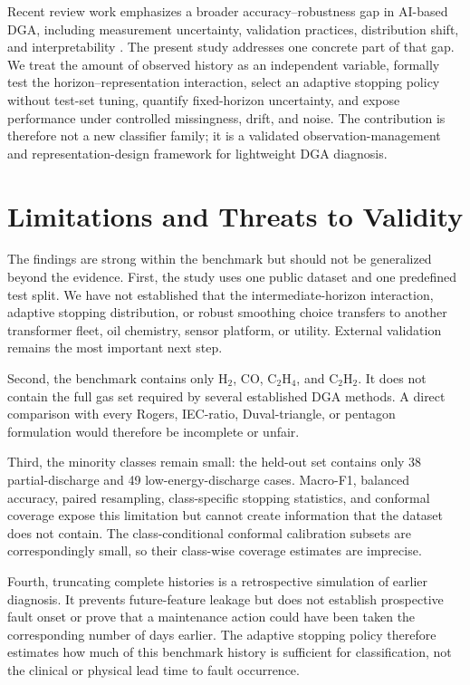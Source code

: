 \documentclass[conference]{IEEEtran}
\begin{document}
Recent review work emphasizes a broader accuracy--robustness gap in AI-based DGA, including measurement uncertainty, validation practices, distribution shift, and interpretability \cite{bouzar2026robustness}. The present study addresses one concrete part of that gap. We treat the amount of observed history as an independent variable, formally test the horizon--representation interaction, select an adaptive stopping policy without test-set tuning, quantify fixed-horizon uncertainty, and expose performance under controlled missingness, drift, and noise. The contribution is therefore not a new classifier family; it is a validated observation-management and representation-design framework for lightweight DGA diagnosis.

\section{Limitations and Threats to Validity}
The findings are strong within the benchmark but should not be generalized beyond the evidence. First, the study uses one public dataset and one predefined test split. We have not established that the intermediate-horizon interaction, adaptive stopping distribution, or robust smoothing choice transfers to another transformer fleet, oil chemistry, sensor platform, or utility. External validation remains the most important next step.

Second, the benchmark contains only H$_2$, CO, C$_2$H$_4$, and C$_2$H$_2$. It does not contain the full gas set required by several established DGA methods. A direct comparison with every Rogers, IEC-ratio, Duval-triangle, or pentagon formulation would therefore be incomplete or unfair.

Third, the minority classes remain small: the held-out set contains only 38 partial-discharge and 49 low-energy-discharge cases. Macro-F1, balanced accuracy, paired resampling, class-specific stopping statistics, and conformal coverage expose this limitation but cannot create information that the dataset does not contain. The class-conditional conformal calibration subsets are correspondingly small, so their class-wise coverage estimates are imprecise.

Fourth, truncating complete histories is a retrospective simulation of earlier diagnosis. It prevents future-feature leakage but does not establish prospective fault onset or prove that a maintenance action could have been taken the corresponding number of days earlier. The adaptive stopping policy therefore estimates how much of this benchmark history is sufficient for classification, not the clinical or physical lead time to fault occurrence.
\end{document}

